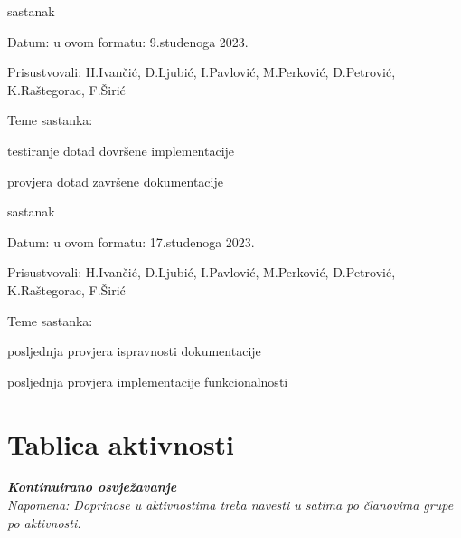 \begin{packed_enum}
			\item  sastanak
			\item[] \begin{packed_item}
				\item Datum: u ovom formatu: 9.studenoga 2023.
				\item Prisustvovali: H.Ivančić, D.Ljubić, I.Pavlović, M.Perković, D.Petrović, K.Raštegorac, F.Širić
				\item Teme sastanka:
				\begin{packed_item}
					\item  testiranje dotad dovršene implementacije
					\item  provjera dotad završene dokumentacije
				\end{packed_item}
			\end{packed_item}
			
			\item  sastanak
			\item[] \begin{packed_item}
				\item Datum: u ovom formatu: 17.studenoga 2023.
				\item Prisustvovali: H.Ivančić, D.Ljubić, I.Pavlović, M.Perković, D.Petrović, K.Raštegorac, F.Širić
				\item Teme sastanka:
				\begin{packed_item}
					\item  posljednja provjera ispravnosti dokumentacije
					\item  posljednja provjera implementacije funkcionalnosti
				\end{packed_item}
			\end{packed_item}
			
			
			
			
		\end{packed_enum}
		
		\eject
		\section*{Tablica aktivnosti}
		
			\textbf{\textit{Kontinuirano osvježavanje}}\\
			
			 \textit{Napomena: Doprinose u aktivnostima treba navesti u satima po članovima grupe po aktivnosti.}

